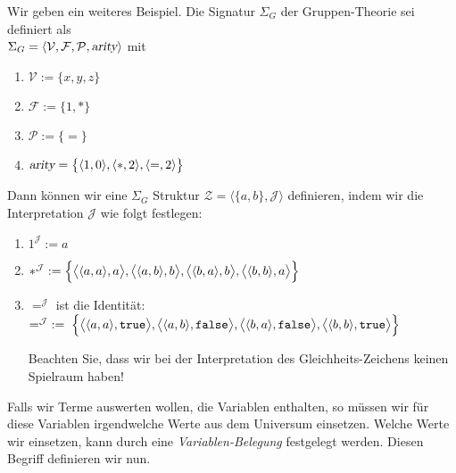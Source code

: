 \example
 Wir geben ein weiteres  Beispiel.
Die Signatur  $\Sigma_G$ der Gruppen-Theorie sei definiert als \\[0.2cm]
\hspace*{1.3cm} $\Sigma_G = \langle \mathcal{V}, \mathcal{F}, \mathcal{P},\textsl{arity}\rangle$ 
\quad mit
\begin{enumerate}
\item $\mathcal{V} := \{ x, y, z \}$
\item $\mathcal{F} := \{ 1, * \}$
\item $\mathcal{P} := \{ \mathtt{=} \}$
\item $\textsl{arity} = \bigl\{ \pair(1,0), \pair(*,2), \pair(\mathtt{=},2)\bigr\}$
\end{enumerate}
Dann k\"{o}nnen wir eine $\Sigma_G$ Struktur $\mathcal{Z} = \langle \{a,
b\},\mathcal{J}\rangle$ definieren, 
indem wir die Interpretation $\mathcal{J}$ 
wie folgt festlegen:
\begin{enumerate}
\item $1^\mathcal{J} := a$ 
\item $*^\mathcal{J} := \Bigl\{ \bigl\langle\pair(a,a), a\bigr\rangle,
                                   \bigl\langle\pair(a,b), b\bigr\rangle,
                                   \bigl\langle\pair(b,a), b\bigr\rangle,
                                   \bigl\langle\pair(b,b), a\bigr\rangle \Bigr\}$
\item $=^\mathcal{J}$ ist die Identit\"{a}t: \\[0.2cm]
       $=^\mathcal{J} \;:=\; \Bigl\{ \bigl\langle\pair(a,a), \mathtt{true}\bigr\rangle,
                                 \bigl\langle\pair(a,b), \mathtt{false}\bigr\rangle,
                                 \bigl\langle\pair(b,a), \mathtt{false}\bigr\rangle,
                                 \bigl\langle\pair(b,b), \mathtt{true}\bigr\rangle \Bigr\}$
                                 
      Beachten Sie, dass wir bei der Interpretation des Gleichheits-Zeichens 
      keinen Spielraum haben! \eox
\end{enumerate}

Falls wir Terme auswerten wollen, die Variablen enthalten, so m\"{u}ssen wir f\"{u}r diese
Variablen irgendwelche Werte aus dem Universum einsetzen.  Welche Werte wir einsetzen, kann
durch eine \emph{Variablen-Belegung} festgelegt werden.  Diesen Begriff definieren wir
nun.

